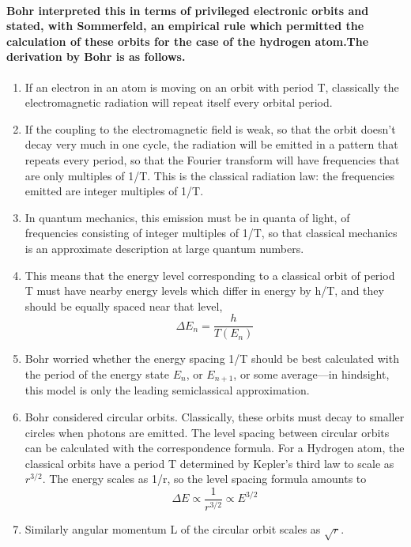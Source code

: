 \documentclass[%
 reprint,
 amsmath,amssymb,
 aps,
]{revtex4-2}
\begin{document}
\paragraph{Bohr interpreted this in terms of privileged electronic orbits and stated, with Sommerfeld, an empirical rule which permitted the calculation of these orbits for the case of the hydrogen atom.The derivation by Bohr is as follows.}
\begin{enumerate}
\item If an electron in an atom is moving on an orbit with period T, classically the electromagnetic radiation will repeat itself every orbital period.
\item If the coupling to the electromagnetic field is weak, so that the orbit doesn't decay very much in one cycle, the radiation will be emitted in a pattern that repeats every period, so that the Fourier transform will have frequencies that are only multiples of 1/T. This is the classical radiation law: the frequencies emitted are integer multiples of 1/T.
\item In quantum mechanics, this emission must be in quanta of light, of frequencies consisting of integer multiples of 1/T, so that classical mechanics is an approximate description at large quantum numbers. 
\item This means that the energy level corresponding to a classical orbit of period T must have nearby energy levels which differ in energy by h/T, and they should be equally spaced near that level,
\begin{equation}
  \Delta E_{n}=\frac {h}{T(E_{n})} 
 \end{equation}
\item Bohr worried whether the energy spacing 1/T should be best calculated with the period of the energy state $E_{n}$, or $E_{n+1}$, or some average—in hindsight, this model is only the leading semiclassical approximation.
\item Bohr considered circular orbits. Classically, these orbits must decay to smaller circles when photons are emitted. The level spacing between circular orbits can be calculated with the correspondence formula. For a Hydrogen atom, the classical orbits have a period T determined by Kepler's third law to scale as $r^{3/2}$. The energy scales as 1/r, so the level spacing formula amounts to
\begin{equation}
  \Delta E\propto {\frac {1}{r^{3/2}}}\propto E^{3/2}
 \end{equation}
\item Similarly angular momentum L of the circular orbit scales as $\sqrt {r}$.

\end{enumerate}
\end{document}
